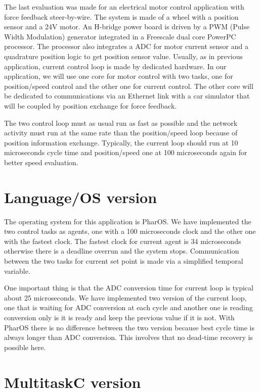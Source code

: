 \documentclass[10pt]{report}
\begin{document}
The last evaluation was made for an electrical motor control application with force feedback steer-by-wire.
The system is made of a wheel with a position sensor and a 24V motor. An H-bridge power board is driven
by a PWM (Pulse Width Modulation) generator integrated in a Freescale dual core PowerPC processor. The
processor also integrates a ADC for motor current sensor and a quadrature position logic to get position
sensor value. Usually, as in previous application, current control loop is made by dedicated hardware.
In our application, we will use one core for motor control with two tasks, one for position/speed control
and the other one for current control. The other core will be dedicated to communications via an Ethernet
link with a car simulator that will be coupled by position exchange for force feedback.

The two control loop must as usual run as fast as possible and the network activity must run at the same
rate than the position/speed loop because of position information exchange. Typically, the current loop
should run at 10 microseconds cycle time and position/speed one at 100 microseconds again for better
speed evaluation.

\section{Language/OS version}

The operating system for this application is PharOS. We have implemented the two control tasks as agents,
one with a 100 microseconds clock and the other one with the fastest clock. The fastest clock for current
agent is 34 microseconds otherwise there is a deadline overrun and the system stops. Communication
between the two tasks for current set point is made via a simplified temporal variable.

One important thing is that the ADC conversion time for current loop is typical about 25 microseconds. We
have implemented two version of the current loop, one that is waiting for ADC conversion at each cycle
and another one is reading conversion only is it is ready and keep the previous value if it is not. With
PharOS there is no difference between the two version because best cycle time is always longer than
ADC conversion. This involves that no dead-time recovery is possible here.

\section{MultitaskC version}
\end{document}
